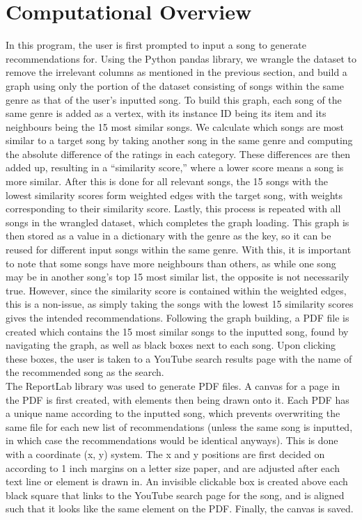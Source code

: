 \documentclass[fontsize=11pt]{article}
\begin{document}
\section*{Computational Overview}

\hspace{\parindent} In this program, the user is first prompted to input a song to generate recommendations for. Using the Python pandas library, we wrangle the dataset to remove the irrelevant columns as mentioned in the previous section, and build a graph using only the portion of the dataset consisting of songs within the same genre as that of the user’s inputted song. To build this graph, each song of the same genre is added as a vertex, with its instance ID being its item and its neighbours being the 15 most similar songs. We calculate which songs are most similar to a target song by taking another song in the same genre and computing the absolute difference of the ratings in each category. These differences are then added up, resulting in a “similarity score,” where a lower score means a song is more similar. After this is done for all relevant songs, the 15 songs with the lowest similarity scores form weighted edges with the target song, with weights corresponding to their similarity score. Lastly, this process is repeated with all songs in the wrangled dataset, which completes the graph loading. This graph is then stored as a value in a dictionary with the genre as the key, so it can be reused for different input songs within the same genre. With this, it is important to note that some songs have more neighbours than others, as while one song may be in another song’s top 15 most similar list, the opposite is not necessarily true. However, since the similarity score is contained within the weighted edges, this is a non-issue, as simply taking the songs with the lowest 15 similarity scores gives the intended recommendations. Following the graph building, a PDF file is created which contains the 15 most similar songs to the inputted song, found by navigating the graph, as well as black boxes next to each song. Upon clicking these boxes, the user is taken to a YouTube search results page with the name of the recommended song as the search. \\

\hspace{\parindent} The ReportLab library was used to generate PDF files. A canvas for a page in the PDF is first created, with elements then being drawn onto it. Each PDF has a unique name according to the inputted song, which prevents overwriting the same file for each new list of recommendations (unless the same song is inputted, in which case the recommendations would be identical anyways). This is done with a coordinate (x, y) system. The x and y positions are first decided on according to 1 inch margins on a letter size paper, and are adjusted after each text line or element is drawn in. An invisible clickable box is created above each black square that links to the YouTube search page for the song, and is aligned such that it looks like the same element on the PDF. Finally, the canvas is saved.
\end{document}
